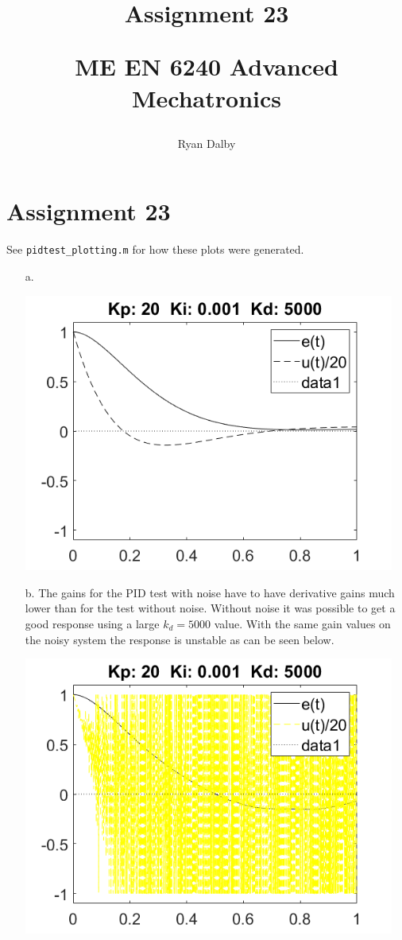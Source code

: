 \documentclass[12pt]{article}
\title{
    Assignment 23

    \large{
        ME EN 6240 Advanced Mechatronics
    }  
}
\author{
        Ryan Dalby
}
\date{\displaydate{date}}
\begin{document}
\maketitle

\section*{Assignment 23}
See \verb|pidtest_plotting.m| for how these plots were generated.

\begin{enumerate}
    \item[a.] 

    \includegraphics[width=4.8in]{23a.png}

    \item[b.] 
    The gains for the PID test with noise have to have derivative gains much lower than for the test without noise.
    Without noise it was possible to get a good response using a large $k_d = 5000$ value. 
    With the same gain values on the noisy system the response is unstable as can be seen below.

    \includegraphics[width=4.8in]{23b.png}


\end{enumerate}
\end{document}
